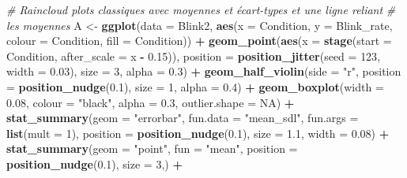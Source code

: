 \documentclass[
  french,
]{book}
\newenvironment{Shaded}{\begin{snugshade}}{\end{snugshade}}
\newcommand{\CommentTok}[1]{\textcolor[rgb]{0.56,0.35,0.01}{\textit{#1}}}
\newcommand{\DataTypeTok}[1]{\textcolor[rgb]{0.13,0.29,0.53}{#1}}
\newcommand{\DecValTok}[1]{\textcolor[rgb]{0.00,0.00,0.81}{#1}}
\newcommand{\FloatTok}[1]{\textcolor[rgb]{0.00,0.00,0.81}{#1}}
\newcommand{\KeywordTok}[1]{\textcolor[rgb]{0.13,0.29,0.53}{\textbf{#1}}}
\newcommand{\NormalTok}[1]{#1}
\newcommand{\OperatorTok}[1]{\textcolor[rgb]{0.81,0.36,0.00}{\textbf{#1}}}
\newcommand{\OtherTok}[1]{\textcolor[rgb]{0.56,0.35,0.01}{#1}}
\newcommand{\StringTok}[1]{\textcolor[rgb]{0.31,0.60,0.02}{#1}}
\begin{document}
\begin{Shaded}
\begin{Highlighting}[]
\CommentTok{# Raincloud plots classiques avec moyennes et écart-types et une ligne reliant }
\CommentTok{# les moyennes }
\NormalTok{A <-}
\StringTok{  }\KeywordTok{ggplot}\NormalTok{(}\DataTypeTok{data =}\NormalTok{ Blink2, }\KeywordTok{aes}\NormalTok{(}\DataTypeTok{x =}\NormalTok{ Condition, }\DataTypeTok{y =}\NormalTok{ Blink_rate,  }
                            \DataTypeTok{colour =}\NormalTok{ Condition, }\DataTypeTok{fill =}\NormalTok{ Condition)) }\OperatorTok{+}
\StringTok{  }\KeywordTok{geom_point}\NormalTok{(}\KeywordTok{aes}\NormalTok{(}\DataTypeTok{x =} \KeywordTok{stage}\NormalTok{(}\DataTypeTok{start =}\NormalTok{ Condition, }\DataTypeTok{after_scale =}\NormalTok{ x }\OperatorTok{-}\StringTok{ }\FloatTok{0.15}\NormalTok{)),}
             \DataTypeTok{position =} \KeywordTok{position_jitter}\NormalTok{(}\DataTypeTok{seed =} \DecValTok{123}\NormalTok{, }\DataTypeTok{width =} \FloatTok{0.03}\NormalTok{),}
             \DataTypeTok{size =} \DecValTok{3}\NormalTok{, }\DataTypeTok{alpha =} \FloatTok{0.3}\NormalTok{) }\OperatorTok{+}
\StringTok{  }\KeywordTok{geom_half_violin}\NormalTok{(}\DataTypeTok{side =} \StringTok{"r"}\NormalTok{, }
                   \DataTypeTok{position =} \KeywordTok{position_nudge}\NormalTok{(}\FloatTok{0.1}\NormalTok{), }
                   \DataTypeTok{size =} \DecValTok{1}\NormalTok{, }\DataTypeTok{alpha =} \FloatTok{0.4}\NormalTok{) }\OperatorTok{+}\StringTok{  }
\StringTok{  }\KeywordTok{geom_boxplot}\NormalTok{(}\DataTypeTok{width =} \FloatTok{0.08}\NormalTok{, }\DataTypeTok{colour =} \StringTok{"black"}\NormalTok{, }\DataTypeTok{alpha =} \FloatTok{0.3}\NormalTok{, }
               \DataTypeTok{outlier.shape =} \OtherTok{NA}\NormalTok{) }\OperatorTok{+}\StringTok{ }
\StringTok{  }\KeywordTok{stat_summary}\NormalTok{(}\DataTypeTok{geom =} \StringTok{"errorbar"}\NormalTok{,}
               \DataTypeTok{fun.data =} \StringTok{"mean_sdl"}\NormalTok{,}
               \DataTypeTok{fun.args =} \KeywordTok{list}\NormalTok{(}\DataTypeTok{mult =} \DecValTok{1}\NormalTok{),}
               \DataTypeTok{position =} \KeywordTok{position_nudge}\NormalTok{(}\FloatTok{0.1}\NormalTok{), }
               \DataTypeTok{size =} \FloatTok{1.1}\NormalTok{, }\DataTypeTok{width =} \FloatTok{0.08}\NormalTok{) }\OperatorTok{+}
\StringTok{  }\KeywordTok{stat_summary}\NormalTok{(}\DataTypeTok{geom =} \StringTok{"point"}\NormalTok{,}
               \DataTypeTok{fun =} \StringTok{"mean"}\NormalTok{, }
               \DataTypeTok{position =} \KeywordTok{position_nudge}\NormalTok{(}\FloatTok{0.1}\NormalTok{),}
               \DataTypeTok{size =} \DecValTok{3}\NormalTok{,) }\OperatorTok{+}

\end{Highlighting}
\end{Shaded}
\end{document}

